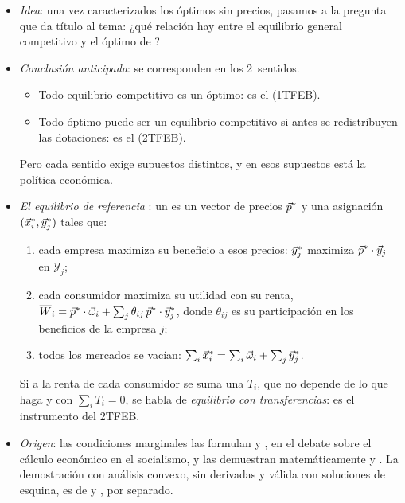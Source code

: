 \documentclass[11pt]{article}
\begin{document}
\begin{itemize}
\item \emph{Idea}: una vez caracterizados los óptimos sin precios, pasamos a la pregunta que da título al tema: ¿qué relación hay entre el equilibrio general competitivo y el óptimo de ?
\item \emph{Conclusión anticipada}: se corresponden en los 2~sentidos.
  \begin{itemize}
  \item Todo equilibrio competitivo es un óptimo: es el  (1TFEB).
  \item Todo óptimo puede ser un equilibrio competitivo si antes se redistribuyen las dotaciones: es el  (2TFEB).
  \end{itemize}
  Pero cada sentido exige supuestos distintos, y en esos supuestos está la política económica.
\item \emph{El equilibrio de referencia} : un  es un vector de precios $\vec{p}^*$ y una asignación $(\vec{x}^*_i,\vec{y}^*_j)$ tales que:
  \begin{enumerate}
  \item cada empresa maximiza su beneficio a esos precios: $\vec{y}^*_j$ maximiza $\vec{p}^*\cdot\vec{y}_j$ en $\mathcal{Y}_j$;
  \item cada consumidor maximiza su utilidad con su renta, $\overline{W}_i=\vec{p}^*\cdot\vec{\omega}_i+\sum_j\theta_{ij}\,\vec{p}^*\cdot\vec{y}^*_j$, donde $\theta_{ij}$ es su participación en los beneficios de la empresa $j$;
  \item todos los mercados se vacían: $\sum_i\vec{x}^*_i=\sum_i\vec{\omega}_i+\sum_j\vec{y}^*_j$.
  \end{enumerate}
  Si a la renta de cada consumidor se suma una  $T_i$, que no depende de lo que haga y con $\sum_iT_i=0$, se habla de \emph{equilibrio con transferencias}: es el instrumento del 2TFEB.
\item \emph{Origen}: las condiciones marginales las formulan \textcite{Lerner1934Economic,Lerner1944Economics} y \textcite{Lange1942Foundations}, en el debate sobre el cálculo económico en el socialismo, y las demuestran matemáticamente \textcite{Hotelling1938General} y \textcite{Allais1943Recherche}. La demostración con análisis convexo, sin derivadas y válida con soluciones de esquina, es de \textcite{Arrow1951Extension} y \textcite{Debreu1951Coefficient,Debreu1954Valuation}, por separado.
\end{itemize}
\end{document}
